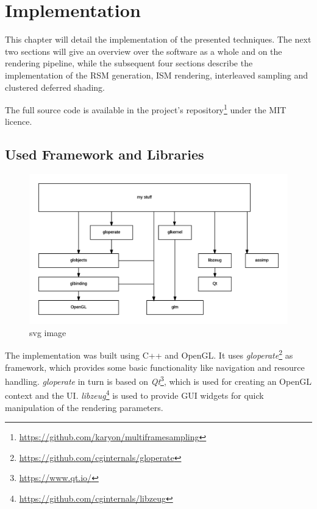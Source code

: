 

\chapter{Implementation}
\label{chap:implementation}

This chapter will detail the implementation of the presented techniques. The next two sections will give an overview over the software as a whole and on the rendering pipeline, while the subsequent four sections describe the implementation of the RSM generation, ISM rendering, interleaved sampling and clustered deferred shading.

The full source code is available in the project's repository\footnote{\url{https://github.com/karyon/multiframesampling}} under the MIT licence.


\section{Used Framework and Libraries}

\begin{figure}[htbp]
  \centering
  \includegraphics{graphics/Architecture}
  \caption{svg image}
\end{figure}

The implementation was built using C++ and OpenGL. It uses \textit{gloperate}\footnote{\url{https://github.com/cginternals/gloperate}} as framework, which provides some basic functionality like navigation and resource handling. \textit{gloperate} in turn is based on \textit{Qt}\footnote{\url{https://www.qt.io/}}, which is used for creating an OpenGL context and the UI. \textit{libzeug}\footnote{\url{https://github.com/cginternals/libzeug}} is used to provide GUI widgets for quick manipulation of the rendering parameters.

